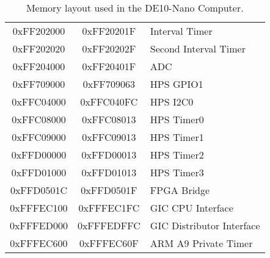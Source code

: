\begin{table}[h]
\begin{center}
\begin{tabular}{c|c|l}
            0xFF202000
            & 0xFF20201F
            & Interval Timer
        \\
            0xFF202020
            & 0xFF20202F
            & Second Interval Timer
        \\
            0xFF204000
            & 0xFF20401F
            & ADC
        \\
            0xFF709000
            & 0xFF709063
            & HPS GPIO1
        \\
            0xFFC04000
            & 0xFFC040FC
            & HPS I2C0
        \\
            0xFFC08000
            & 0xFFC08013
            & HPS Timer0
        \\
            0xFFC09000
            & 0xFFC09013
            & HPS Timer1
        \\
            0xFFD00000
            & 0xFFD00013
            & HPS Timer2
        \\
            0xFFD01000
            & 0xFFD01013
            & HPS Timer3
        \\
            0xFFD0501C
            & 0xFFD0501F
            & FPGA Bridge
        \\
            0xFFFEC100
            & 0xFFFEC1FC
            & GIC CPU Interface
        \\
            0xFFFED000
            & 0xFFFEDFFC
            & GIC Distributor Interface
        \\
            0xFFFEC600
            & 0xFFFEC60F
            & ARM A9 Private Timer
        \\
    \end{tabular}
    \caption{Memory layout used in the DE10-Nano Computer.}
    \label{tab:memorylayout}
    \end{center}
\end{table}



\clearpage







 


